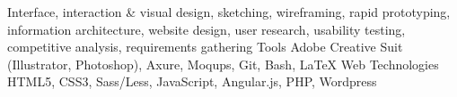   \begin{cvskills}
                 {Interface, interaction \& visual design, sketching, wireframing, rapid prototyping, information architecture, website design, user research, usability testing, competitive analysis, requirements gathering}
	\cvskill
		{Tools}
		{Adobe Creative Suit (Illustrator, Photoshop), Axure, Moqups, Git, Bash, LaTeX}
  	\cvskill
		{Web Technologies}
		{HTML5, CSS3, Sass/Less, JavaScript, Angular.js, PHP, Wordpress}
  \end{cvskills}